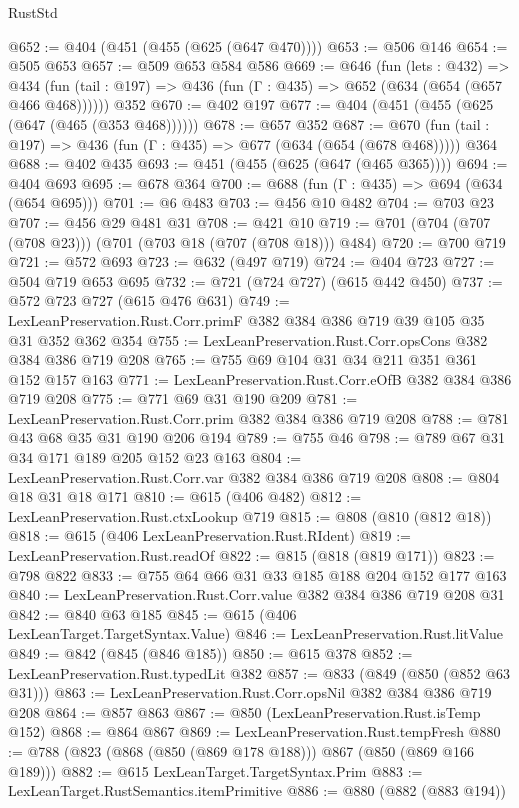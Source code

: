 \begin{lexlean}{RustStd}
\begin{coremodule}
@652 := @404 (@451 (@455 (@625 (@647 @470))))
@653 := @506 @146
@654 := @505 @653
@657 := @509 @653 @584 @586
@669 := @646
    (fun (lets : @432) =>
    @434 (fun (tail : @197) => @436 (fun (Γ : @435) => @652 (@634 (@654 (@657 @466 @468))))))
    @352
@670 := @402 @197
@677 := @404 (@451 (@455 (@625 (@647 (@465 (@353 @468))))))
@678 := @657 @352
@687 := @670 (fun (tail : @197) => @436 (fun (Γ : @435) => @677 (@634 (@654 (@678 @468))))) @364
@688 := @402 @435
@693 := @451 (@455 (@625 (@647 (@465 @365))))
@694 := @404 @693
@695 := @678 @364
@700 := @688 (fun (Γ : @435) => @694 (@634 (@654 @695)))
@701 := @6 @483
@703 := @456 @10 @482
@704 := @703 @23
@707 := @456 @29 @481 @31
@708 := @421 @10
@719 := @701 (@704 (@707 (@708 @23))) (@701 (@703 @18 (@707 (@708 @18))) @484)
@720 := @700 @719
@721 := @572 @693
@723 := @632 (@497 @719)
@724 := @404 @723
@727 := @504 @719 @653 @695
@732 := @721 (@724 @727) (@615 @442 @450)
@737 := @572 @723 @727 (@615 @476 @631)
@749 := LexLeanPreservation.Rust.Corr.primF @382 @384 @386 @719 @39 @105 @35 @31 @352 @362 @354
@755 := LexLeanPreservation.Rust.Corr.opsCons @382 @384 @386 @719 @208
@765 := @755 @69 @104 @31 @34 @211 @351 @361 @152 @157 @163
@771 := LexLeanPreservation.Rust.Corr.eOfB @382 @384 @386 @719 @208
@775 := @771 @69 @31 @190 @209
@781 := LexLeanPreservation.Rust.Corr.prim @382 @384 @386 @719 @208
@788 := @781 @43 @68 @35 @31 @190 @206 @194
@789 := @755 @46
@798 := @789 @67 @31 @34 @171 @189 @205 @152 @23 @163
@804 := LexLeanPreservation.Rust.Corr.var @382 @384 @386 @719 @208
@808 := @804 @18 @31 @18 @171
@810 := @615 (@406 @482)
@812 := LexLeanPreservation.Rust.ctxLookup @719
@815 := @808 (@810 (@812 @18))
@818 := @615 (@406 LexLeanPreservation.Rust.RIdent)
@819 := LexLeanPreservation.Rust.readOf
@822 := @815 (@818 (@819 @171))
@823 := @798 @822
@833 := @755 @64 @66 @31 @33 @185 @188 @204 @152 @177 @163
@840 := LexLeanPreservation.Rust.Corr.value @382 @384 @386 @719 @208 @31
@842 := @840 @63 @185
@845 := @615 (@406 LexLeanTarget.TargetSyntax.Value)
@846 := LexLeanPreservation.Rust.litValue
@849 := @842 (@845 (@846 @185))
@850 := @615 @378
@852 := LexLeanPreservation.Rust.typedLit @382
@857 := @833 (@849 (@850 (@852 @63 @31)))
@863 := LexLeanPreservation.Rust.Corr.opsNil @382 @384 @386 @719 @208
@864 := @857 @863
@867 := @850 (LexLeanPreservation.Rust.isTemp @152)
@868 := @864 @867
@869 := LexLeanPreservation.Rust.tempFresh
@880 := @788 (@823 (@868 (@850 (@869 @178 @188))) @867 (@850 (@869 @166 @189)))
@882 := @615 LexLeanTarget.TargetSyntax.Prim
@883 := LexLeanTarget.RustSemantics.itemPrimitive
@886 := @880 (@882 (@883 @194))

\end{coremodule}
\end{lexlean}
